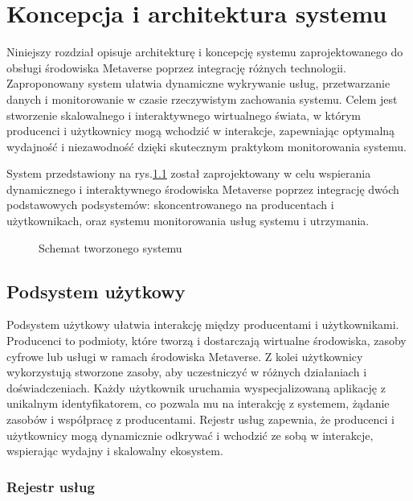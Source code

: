 \chapter{Koncepcja i architektura systemu}

Niniejszy rozdział opisuje architekturę i koncepcję systemu zaprojektowanego do obsługi środowiska Metaverse poprzez integrację różnych technologii. Zaproponowany system ułatwia dynamiczne wykrywanie usług, przetwarzanie danych i monitorowanie w czasie rzeczywistym zachowania systemu. Celem jest stworzenie skalowalnego i interaktywnego wirtualnego świata, w którym producenci i użytkownicy mogą wchodzić w interakcje, zapewniając optymalną wydajność i niezawodność dzięki skutecznym praktykom monitorowania systemu.

System przedstawiony na rys.\ref{designedSystem} został zaprojektowany w celu wspierania dynamicznego i interaktywnego środowiska Metaverse poprzez integrację dwóch podstawowych podsystemów: skoncentrowanego na producentach i użytkownikach, oraz systemu monitorowania usług systemu i utrzymania.


\begin{figure}
    \centering
    
    \caption{Schemat tworzonego systemu}
    \label{designedSystem}
\end{figure}



\section{Podsystem użytkowy}

Podsystem użytkowy ułatwia interakcję między producentami i użytkownikami. Producenci to podmioty, które tworzą i dostarczają wirtualne środowiska, zasoby cyfrowe lub usługi w ramach środowiska Metaverse. Z kolei użytkownicy wykorzystują stworzone zasoby, aby uczestniczyć w różnych działaniach i doświadczeniach. Każdy użytkownik uruchamia wyspecjalizowaną aplikację z unikalnym identyfikatorem, co pozwala mu na interakcję z systemem, żądanie zasobów i współpracę z producentami. Rejestr usług zapewnia, że producenci i użytkownicy mogą dynamicznie odkrywać i wchodzić ze sobą w interakcje, wspierając wydajny i skalowalny ekosystem.

\subsection{Rejestr usług}

